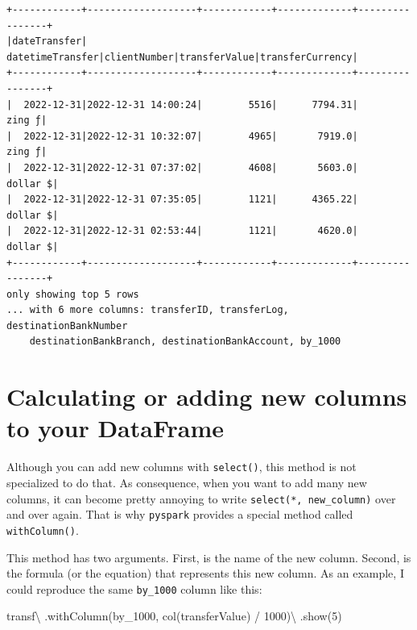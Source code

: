 \documentclass[
  11pt,
  letterpaper,
  DIV=11,
  numbers=noendperiod]{scrreprt}
\newenvironment{Shaded}{\begin{snugshade}}{\end{snugshade}}
\newcommand{\DecValTok}[1]{\textcolor[rgb]{0.68,0.00,0.00}{#1}}
\newcommand{\NormalTok}[1]{\textcolor[rgb]{0.00,0.23,0.31}{#1}}
\newcommand{\OperatorTok}[1]{\textcolor[rgb]{0.37,0.37,0.37}{#1}}
\newcommand{\StringTok}[1]{\textcolor[rgb]{0.13,0.47,0.30}{#1}}
\begin{document}
\begin{verbatim}
+------------+-------------------+------------+-------------+----------------+
|dateTransfer|   datetimeTransfer|clientNumber|transferValue|transferCurrency|
+------------+-------------------+------------+-------------+----------------+
|  2022-12-31|2022-12-31 14:00:24|        5516|      7794.31|          zing ƒ|
|  2022-12-31|2022-12-31 10:32:07|        4965|       7919.0|          zing ƒ|
|  2022-12-31|2022-12-31 07:37:02|        4608|       5603.0|        dollar $|
|  2022-12-31|2022-12-31 07:35:05|        1121|      4365.22|        dollar $|
|  2022-12-31|2022-12-31 02:53:44|        1121|       4620.0|        dollar $|
+------------+-------------------+------------+-------------+----------------+
only showing top 5 rows
... with 6 more columns: transferID, transferLog, destinationBankNumber
    destinationBankBranch, destinationBankAccount, by_1000
\end{verbatim}

\hypertarget{calculating-or-adding-new-columns-to-your-dataframe}{%
\section{Calculating or adding new columns to your
DataFrame}\label{calculating-or-adding-new-columns-to-your-dataframe}}

Although you can add new columns with \texttt{select()}, this method is
not specialized to do that. As consequence, when you want to add many
new columns, it can become pretty annoying to write
\texttt{select(\textquotesingle{}*\textquotesingle{},\ new\_column)}
over and over again. That is why \texttt{pyspark} provides a special
method called \texttt{withColumn()}.

This method has two arguments. First, is the name of the new column.
Second, is the formula (or the equation) that represents this new
column. As an example, I could reproduce the same \texttt{by\_1000}
column like this:

\begin{Shaded}
\begin{Highlighting}[]
\NormalTok{transf}\OperatorTok{\textbackslash{}}
\NormalTok{  .withColumn(}\StringTok{\textquotesingle{}by\_1000\textquotesingle{}}\NormalTok{, col(}\StringTok{\textquotesingle{}transferValue\textquotesingle{}}\NormalTok{) }\OperatorTok{/} \DecValTok{1000}\NormalTok{)}\OperatorTok{\textbackslash{}}
\NormalTok{  .show(}\DecValTok{5}\NormalTok{)}
\end{Highlighting}
\end{Shaded}
\end{document}
